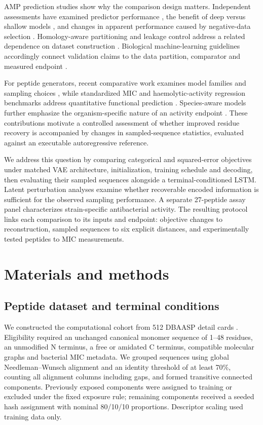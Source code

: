 \documentclass[unnumsec,webpdf,contemporary,large]{oup-authoring-template}
\begin{document}
AMP prediction studies show why the comparison design matters. Independent assessments have examined predictor performance \cite{refXu2021}, the benefit of deep versus shallow models \cite{ref4}, and changes in apparent performance caused by negative-data selection \cite{ref5}. Homology-aware partitioning and leakage control address a related dependence on dataset construction \cite{ref39,ref40}. Biological machine-learning guidelines accordingly connect validation claims to the data partition, comparator and measured endpoint \cite{ref43,ref44,ref45}.

For peptide generators, recent comparative work examines model families and sampling choices \cite{ref8}, while standardized MIC and haemolytic-activity regression benchmarks address quantitative functional prediction \cite{ref13}. Species-aware models further emphasize the organism-specific nature of an activity endpoint \cite{refLLAMP}. These contributions motivate a controlled assessment of whether improved residue recovery is accompanied by changes in sampled-sequence statistics, evaluated against an executable autoregressive reference.

We address this question by comparing categorical and squared-error objectives under matched VAE architecture, initialization, training schedule and decoding, then evaluating their sampled sequences alongside a terminal-conditioned LSTM. Latent perturbation analyses examine whether recoverable encoded information is sufficient for the observed sampling performance. A separate 27-peptide assay panel characterizes strain-specific antibacterial activity. The resulting protocol links each comparison to its inputs and endpoint: objective changes to reconstruction, sampled sequences to six explicit distances, and experimentally tested peptides to MIC measurements.

\section{Materials and methods}

\subsection{Peptide dataset and terminal conditions}

We constructed the computational cohort from 512 DBAASP detail cards \cite{ref10}. Eligibility required an unchanged canonical monomer sequence of 1--48 residues, an unmodified N terminus, a free or amidated C terminus, compatible molecular graphs and bacterial MIC metadata. We grouped sequences using global Needleman--Wunsch alignment \cite{refNW} and an identity threshold of at least 70\%, counting all alignment columns including gaps, and formed transitive connected components. Previously exposed components were assigned to training or excluded under the fixed exposure rule; remaining components received a seeded hash assignment with nominal 80/10/10 proportions. Descriptor scaling used training data only.
\end{document}
